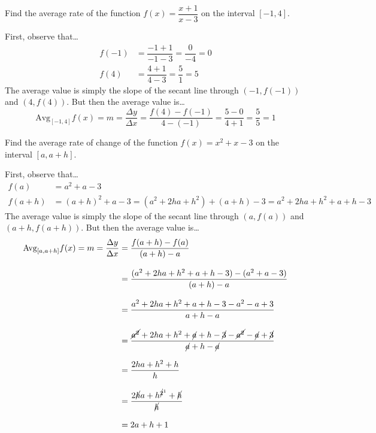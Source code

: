 \documentclass[12pt,letterpaper]{exam}
\begin{document}
\examtitle
{} 
\scores
\newpage

\begin{questions}


\newpage
\question[10] Find the average rate of the function $f(x)= \dfrac{x + 1}{x - 3}$ on the interval $[-1, 4]$. \pspace

\sol First, observe that\dots
	\[
	\begin{aligned}
	f(-1)&= \dfrac{-1 + 1}{-1 - 3}= \dfrac{0}{-4}= 0 \\[0.3cm]
	f(4)&= \dfrac{4 + 1}{4 - 3}= \dfrac{5}{1}= 5
	\end{aligned}
	\]
The average value is simply the slope of the secant line through $\left(-1, f(-1) \right)$ and $\left(4, f(4) \right)$. But then the average value is\dots
	\[
	\text{Avg}_{[-1,4]} f(x)= m= \dfrac{\Delta y}{\Delta x}= \dfrac{f(4) - f(-1)}{4 - (-1)}= \dfrac{5 - 0}{4 + 1}= \dfrac{5}{5}= 1
	\]



\newpage
\question[10] Find the average rate of change of the function $f(x)= x^2 + x - 3$ on the interval $[a, a + h]$. \pspace

\sol First, observe that\dots
	\[
	\begin{aligned}
	f(a)&= a^2 + a - 3 \\[0.3cm]
	f(a + h)&= (a + h)^2 + a - 3= (a^2 + 2ha + h^2) + (a + h) - 3= a^2 + 2ha + h^2 + a + h - 3
	\end{aligned}
	\]
The average value is simply the slope of the secant line through $\left(a, f(a) \right)$ and $\left(a + h, f(a + h) \right)$. But then the average value is\dots
	\[
	\begin{aligned}
	\text{Avg}_{[a, a+h]} f(x)= m= \dfrac{\Delta y}{\Delta x}&= \dfrac{f(a + h) - f(a)}{(a + h) - a} \\[0.3cm]
	&= \dfrac{(a^2 + 2ha + h^2 + a + h - 3) - (a^2 + a - 3)}{(a + h) - a} \\[0.3cm]
	&= \dfrac{a^2 + 2ha + h^2 + a + h - 3 - a^2 - a + 3}{a + h - a} \\[0.3cm]
	&= \dfrac{\cancel{a^2} + 2ha + h^2 + \cancel{a} + h - \cancel{3} - \cancel{a^2} - \cancel{a} + \cancel{3}}{\cancel{a} + h - \cancel{a}} \\[0.3cm]
	&= \dfrac{2ha + h^2 + h}{h} \\[0.3cm]
	&= \dfrac{2\cancel{h}a + h^{\cancel{2}^1} + \cancel{h}}{\cancel{h}} \\[0.3cm]
	&= 2a + h + 1
	\end{aligned}
	\]




\end{questions}
\end{document}
